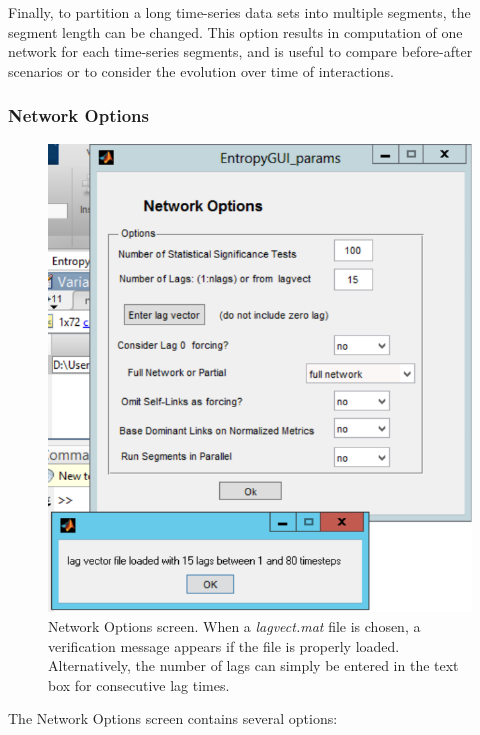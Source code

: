 \documentclass[a4paper]{article}
\begin{document}
Finally, to partition a long time-series data sets into multiple segments, the segment length can be changed.  This option results in computation of one network for each time-series segments, and is useful to compare before-after scenarios or to consider the evolution over time of interactions.

\subsubsection{Network Options}

\begin{figure}[h!]\label{fig:start}
\begin{center}
\includegraphics[scale=.5]{Image_NetworkOptions_LoadLagVect.pdf}
\caption{Network Options screen.  When a \textit{lagvect.mat} file is chosen, a verification message appears if the file is properly loaded. Alternatively, the number of lags can simply be entered in the text box for consecutive lag times.}
\end{center}
\end{figure}

The Network Options screen contains several options:
\end{document}
